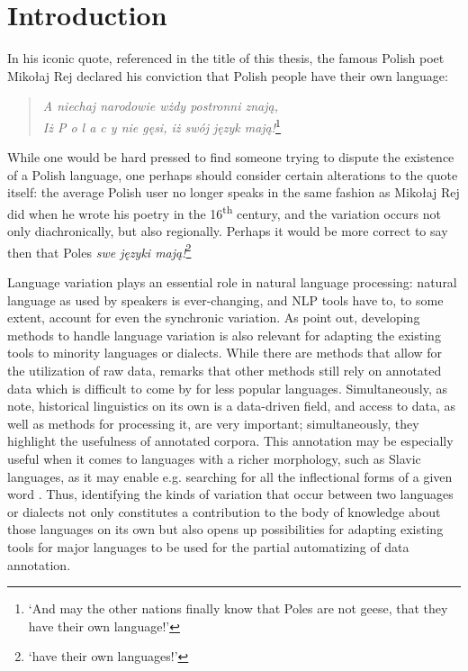 \section{Introduction}
\label{sec:intro}

In his iconic quote, referenced in the title of this thesis, the famous Polish poet Mikołaj Rej declared his conviction that Polish people have their own language: 

\begin{quote}
\centering
   \textit{A niechaj narodowie wżdy postronni znają, \\
    Iż P o l a c y nie gęsi, iż swój język mają!}\footnote{ `And may the other nations finally know that Poles are not geese, that they have their own language!'} \\
\raggedleft
\citet{mikołaj_rej}
\end{quote}

While one would be hard pressed to find someone trying to dispute the existence of a Polish language, one perhaps should consider certain alterations to the quote itself: the average Polish user no longer speaks in the same fashion as Mikołaj Rej did when he wrote his poetry in the 16\textsuperscript{th} century, and the variation occurs not only diachronically, but also regionally. Perhaps it would be more correct to say then that Poles \textit{swe języki mają!}\footnote{ `have their own languages!'}

Language variation plays an essential role in natural language processing: natural language as used by speakers is ever-changing, and NLP tools have to, to some extent, account for even the synchronic variation. As \citet{Zampieri2020NaturalLP} point out, developing methods to handle language variation is also relevant for adapting the existing tools to minority languages or dialects. While there are methods that allow for the utilization of raw data, \citet{ponti_2019} remarks that other methods still rely on annotated data which is difficult to come by for less popular languages. Simultaneously, as \citet{quantitative-historical} note, historical linguistics on its own is a data-driven field, and access to data, as well as methods for processing it, are very important; simultaneously, they highlight the usefulness of annotated corpora. This annotation may be especially useful when it comes to languages with a richer morphology, such as Slavic languages, as it may enable e.g. searching for all the inflectional forms of a given word \citep{pęzik_2012}. Thus, identifying the kinds of variation that occur between two languages or dialects not only constitutes a contribution to the body of knowledge about those languages on its own but also opens up possibilities for adapting existing tools for major languages to be used for the partial automatizing of data annotation. 

